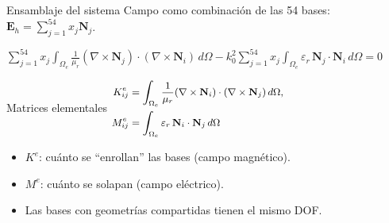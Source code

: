\documentclass{beamer}
\begin{document}
\begin{frame}{Ensamblaje del sistema}
  \vspace{-0.4cm}
  Campo como combinación de las 54 bases:
  $\mathbf{E}_h = \sum_{j=1}^{54} x_j \mathbf{N}_j$.
  \begin{center}
  \begin{minipage}{0.92\textwidth}
    \begin{center}
      $\scriptstyle
      \sum_{j=1}^{54} x_j \int_{\Omega_e} \frac{1}{\mu_r}
      (\nabla \times \mathbf{N}_j) \cdot (\nabla \times \mathbf{N}_i)\,d\Omega
      - k_0^2 \sum_{j=1}^{54} x_j \int_{\Omega_e} \varepsilon_r\,
      \mathbf{N}_j \cdot \mathbf{N}_i\,d\Omega = 0$
    \end{center}
    \begin{block}{Matrices elementales}
      \centering
      $\small
      \begin{aligned}
        K_{ij}^e &= \int_{\Omega_e} \frac{1}{\mu_r}
          (\nabla \times \mathbf{N}_i) \cdot (\nabla \times \mathbf{N}_j)\,d\Omega, \\
        M_{ij}^e &= \int_{\Omega_e} \varepsilon_r\,
          \mathbf{N}_i \cdot \mathbf{N}_j\,d\Omega
      \end{aligned}$
    \end{block}
  \end{minipage}
  \end{center}
  \vspace{-0.2cm}
  \begin{itemize}\setlength\itemsep{0pt}
    \item $K^e$: cuánto se ``enrollan'' las bases (campo magnético).
    \item $M^e$: cuánto se solapan (campo eléctrico).
    \item Las bases con geometrías compartidas tienen el mismo DOF.
  \end{itemize}
\end{frame}
\end{document}

